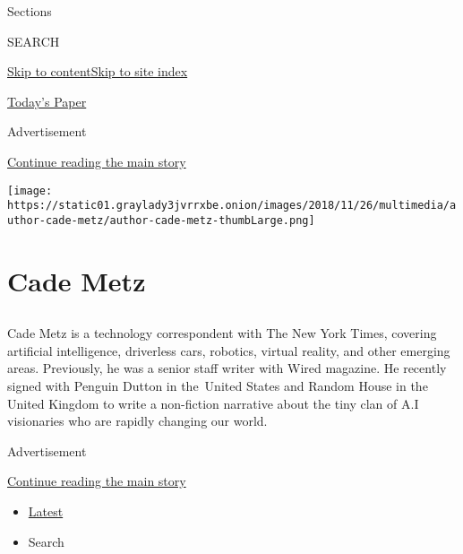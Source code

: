 Sections

SEARCH

\protect\hyperlink{site-content}{Skip to
content}\protect\hyperlink{site-index}{Skip to site index}

\href{https://myaccount.nytimes3xbfgragh.onion/auth/login?response_type=cookie\&client_id=vi}{}

\href{https://www.nytimes3xbfgragh.onion/section/todayspaper}{Today's
Paper}

Advertisement

\protect\hyperlink{after-top}{Continue reading the main story}

\texttt{[image: https://static01.graylady3jvrrxbe.onion/images/2018/11/26/multimedia/author-cade-metz/author-cade-metz-thumbLarge.png]}

\hypertarget{cade-metz}{%
\section{Cade Metz}\label{cade-metz}}

\subsection{}

Cade Metz is a technology correspondent with The New York Times,
covering artificial intelligence, driverless cars, robotics, virtual
reality, and other emerging areas. Previously, he was a senior staff
writer with Wired magazine. He recently signed with Penguin Dutton in
the~United States and Random House in the United Kingdom to write a
non-fiction narrative about the tiny clan of A.I visionaries who are
rapidly changing our world.

Advertisement

\protect\hyperlink{after-mid1}{Continue reading the main story}

\begin{itemize}
\tightlist
\item
  \protect\hyperlink{stream-panel}{Latest}
\item
  Search
\end{itemize}

